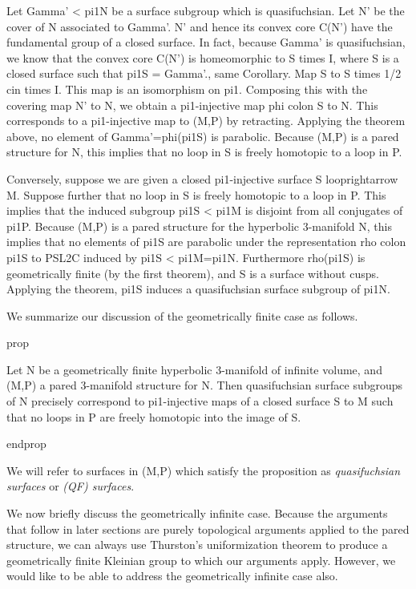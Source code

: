 Let Gamma' < pi1N be a surface subgroup which is quasifuchsian. Let N' be the
cover of N associated to Gamma'. N' and hence its convex core C(N') have the
fundamental group of a closed surface. In fact, because Gamma' is
quasifuchsian, we know that the convex core C(N') is homeomorphic to S times I,
where S is a closed surface such that pi1S = Gamma'.\cite{Mo}, same Corollary.
Map S to S times 1/2 cin times I. This map is an isomorphism on pi1. Composing
this with the covering map N' to N, we obtain a pi1-injective map phi colon
S to N.  This corresponds to a pi1-injective map to (M,P) by retracting.
Applying the theorem above, no element of Gamma'=phi(pi1S) is parabolic.
Because (M,P) is a pared structure for N, this implies that no loop in S is
freely homotopic to a loop in P.

Conversely, suppose we are given a closed pi1-injective surface
S looprightarrow M.  Suppose further that no loop in S is freely homotopic to
a loop in P. This implies that the induced subgroup pi1S < pi1M is disjoint
from all conjugates of pi1P. Because (M,P) is a pared structure for the
hyperbolic 3-manifold N, this implies that no elements of pi1S are parabolic
under the representation rho colon pi1S to PSL2C induced by pi1S < pi1M=pi1N.
Furthermore rho(pi1S) is geometrically finite (by the first theorem), and S is
a surface without cusps.  Applying the theorem, pi1S induces a quasifuchsian
surface subgroup of pi1N.

We summarize our discussion of the geometrically finite case as follows.

prop

Let N be a geometrically finite hyperbolic 3-manifold of infinite volume, and
(M,P) a pared 3-manifold structure for N. Then quasifuchsian surface subgroups
of N precisely correspond to pi1-injective maps of a closed surface S to M such
that no loops in P are freely homotopic into the image of S.


endprop

We will refer to surfaces in (M,P) which satisfy the proposition as
\emph{quasifuchsian surfaces} or \emph{(QF) surfaces}.

We now briefly discuss the geometrically infinite case. Because the arguments
that follow in later sections are purely topological arguments applied to the
pared structure, we can always use Thurston's uniformization theorem to produce
a geometrically finite Kleinian group to which our arguments apply. However, we
would like to be able to address the geometrically infinite case also.

